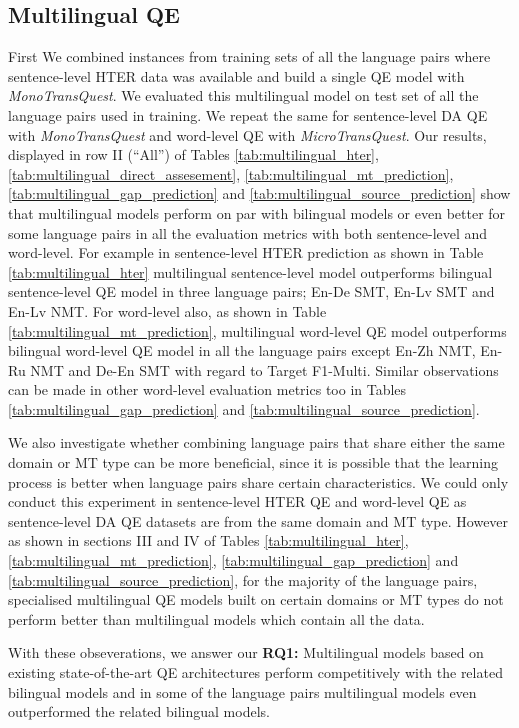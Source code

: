 \subsection{Multilingual QE}
First We combined instances from training sets of all the language pairs where sentence-level HTER data was available and build a single QE model with \textit{MonoTransQuest}. We evaluated this multilingual model on test set of all the language pairs used in training. We repeat the same for sentence-level DA QE with \textit{MonoTransQuest} and word-level QE with \textit{MicroTransQuest}. 
Our results, displayed in row II (``All'') of Tables \ref{tab:multilingual_hter}, \ref{tab:multilingual_direct_assesement}, \ref{tab:multilingual_mt_prediction}, \ref{tab:multilingual_gap_prediction} and \ref{tab:multilingual_source_prediction} show that multilingual models perform on par with bilingual models or even better for some language pairs in all the evaluation metrics with both sentence-level and word-level. For example in sentence-level HTER prediction as shown in Table \ref{tab:multilingual_hter}  multilingual sentence-level model outperforms bilingual sentence-level QE model in three language pairs; En-De SMT, En-Lv SMT and En-Lv NMT. For word-level also, as shown in Table \ref{tab:multilingual_mt_prediction}, multilingual word-level QE model outperforms bilingual word-level QE model in all the language pairs except En-Zh NMT, En-Ru NMT and De-En SMT with regard to Target F1-Multi. Similar observations can be made in other word-level evaluation metrics too in Tables  \ref{tab:multilingual_gap_prediction} and \ref{tab:multilingual_source_prediction}. 

We also investigate whether combining language pairs that share either the same domain or MT type can be more beneficial, since it is possible that the learning process is better when language pairs share certain characteristics. We could only conduct this experiment in sentence-level HTER QE and word-level QE as sentence-level DA QE datasets are from the same domain and MT type. However as shown in sections III and IV of Tables \ref{tab:multilingual_hter}, \ref{tab:multilingual_mt_prediction}, \ref{tab:multilingual_gap_prediction} and \ref{tab:multilingual_source_prediction}, for the majority of the language pairs, specialised multilingual  QE models built on certain domains or MT types do not perform better than multilingual models which contain all the data.

With these obseverations, we answer our \textbf{RQ1:} Multilingual models based on existing state-of-the-art QE architectures perform competitively with the related bilingual models and in some of the language pairs multilingual models even outperformed the related bilingual models. 

